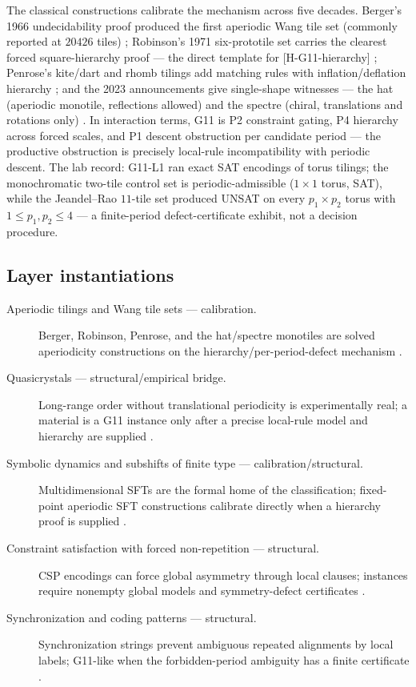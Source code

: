 \documentclass[11pt]{article}
\theoremstyle{definition}
\begin{document}
The classical constructions calibrate the mechanism across five decades. Berger's 1966 undecidability
proof produced the first aperiodic Wang tile set (commonly reported at $20426$ tiles)
\citep{Berger1966}; Robinson's 1971 six-prototile set carries the clearest forced square-hierarchy
proof --- the direct template for \textup{[H-G11-hierarchy]} \citep{Robinson1971}; Penrose's kite/dart
and rhomb tilings add matching rules with inflation/deflation hierarchy \citep{Penrose1974}; and the
2023 announcements give single-shape witnesses --- the hat (aperiodic monotile, reflections allowed)
and the spectre (chiral, translations and rotations only)
\citep{SmithEtAl2023Hat,SmithEtAl2023Spectre}. In interaction terms, G11 is P2 constraint gating, P4
hierarchy across forced scales, and P1 descent obstruction per candidate period --- the productive
obstruction is precisely local-rule incompatibility with periodic descent. The lab record: G11-L1 ran
exact SAT encodings of torus tilings; the monochromatic two-tile control set is periodic-admissible
($1 \times 1$ torus, SAT), while the Jeandel--Rao $11$-tile set produced UNSAT on every $p_1 \times
p_2$ torus with $1 \le p_1, p_2 \le 4$ --- a finite-period defect-certificate exhibit, not a decision
procedure.

\subsection*{Layer instantiations}\label{layer-inst:G11}
\begin{description}
  \item[Aperiodic tilings and Wang tile sets --- calibration.] Berger, Robinson, Penrose, and the
    hat/spectre monotiles are solved aperiodicity constructions on the hierarchy/per-period-defect
    mechanism \citep{Berger1966,Robinson1971,Penrose1974,SmithEtAl2023Hat,SmithEtAl2023Spectre}.
  \item[Quasicrystals --- structural/empirical bridge.] Long-range order without translational
    periodicity is experimentally real; a material is a G11 instance only after a precise local-rule
    model and hierarchy are supplied \citep{ShechtmanEtAl1984,Senechal1995}.
  \item[Symbolic dynamics and subshifts of finite type --- calibration/structural.]
    Multidimensional SFTs are the formal home of the classification; fixed-point aperiodic SFT
    constructions calibrate directly when a hierarchy proof is supplied
    \citep{LindMarcus1995,DurandRomashchenkoShen}.
  \item[Constraint satisfaction with forced non-repetition --- structural.] CSP encodings can force
    global asymmetry through local clauses; instances require nonempty global models and
    symmetry-defect certificates \citep{Dechter2003}.
  \item[Synchronization and coding patterns --- structural.] Synchronization strings prevent
    ambiguous repeated alignments by local labels; G11-like when the forbidden-period ambiguity has a
    finite certificate \citep{HaeuplerShahrasbi2017}.
\end{description}
\end{document}
